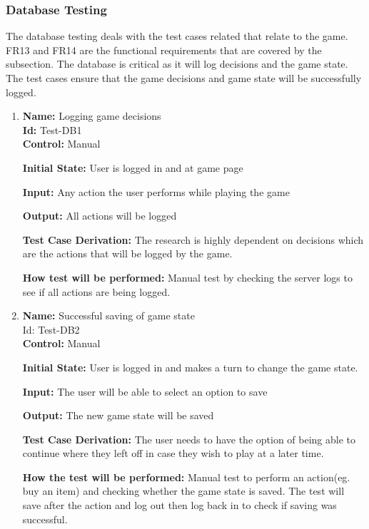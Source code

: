 \documentclass[12pt, titlepage]{article}
\begin{document}
\subsubsection{Database Testing}
The database testing deals with the test cases related that relate to the game. FR13 and FR14 are the functional requirements that are covered by the subsection. The database is critical as it will log decisions and the game state. The test cases ensure that the game decisions and game state will be successfully logged.
\begin{enumerate}

\item{\textbf{Name:} Logging game decisions\\} %
\textbf{Id:} Test-DB1    \label{Test-DB1}\\
\textbf{Control:} Manual
					
\textbf{Initial State:} User is logged in and at game page
					
\textbf{Input:} Any action the user performs while playing the game
					
\textbf{Output: }All actions will be logged

\textbf{Test Case Derivation:} The research is highly dependent on decisions which are the actions that will be logged by the game.

\textbf{How test will be performed:} Manual test by checking the server logs to see if all actions are being logged.

\item{\textbf{Name:} Successful saving of game state\\} %
Id: Test-DB2    \label{Test-DB2}\\
\textbf{Control:} Manual

\textbf{Initial State:} User is logged in and makes a turn to change the game state.

\textbf{Input:} The user will be able to select an option to save

\textbf{Output:} The new game state will be saved

\textbf{Test Case Derivation:} The user needs to have the option of being able to continue where they left off in case they wish to play at a later time.

\textbf{How the test will be performed:} Manual test to perform an action(eg. buy an item) and checking whether the game state is saved. The test will save after the action and log out then log back in to check if saving was successful. 


\end{enumerate}
\end{document}
